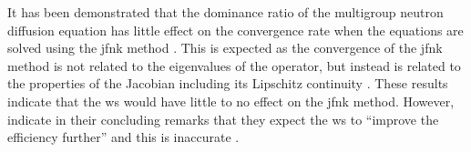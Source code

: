       It has been demonstrated that the dominance ratio of the multigroup
      neutron diffusion equation has little effect on the convergence rate when
      the equations are solved using the \gls{jfnk} method \cite{gill_azmy}.
      This is expected as the convergence of the \gls{jfnk} method is not
      related to the eigenvalues of the operator, but instead is related to the
      properties of the Jacobian including its Lipschitz continuity
      \cite{textbookkelley}. These results indicate that the \gls{ws} would have
      little to no effect on the \gls{jfnk} method. However,
      \citeauthor{qe2paper} indicate in their concluding remarks that they
      expect the \gls{ws} to ``improve the efficiency further'' and this is
      inaccurate \cite{qe2paper}.
      
